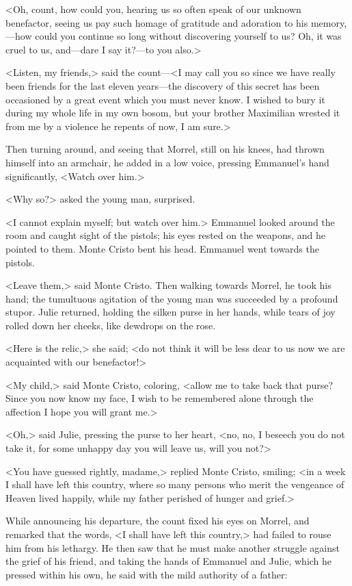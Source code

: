  <Oh, count, how could you, hearing us so often speak of our unknown benefactor, seeing us pay such homage of gratitude and adoration to his memory,—how could you continue so long without discovering yourself to us? Oh, it was cruel to us, and—dare I say it?—to you also.> 

 <Listen, my friends,> said the count—<I may call you so since we have really been friends for the last eleven years—the discovery of this secret has been occasioned by a great event which you must never know. I wished to bury it during my whole life in my own bosom, but your brother Maximilian wrested it from me by a violence he repents of now, I am sure.> 

 Then turning around, and seeing that Morrel, still on his knees, had thrown himself into an armchair, he added in a low voice, pressing Emmanuel's hand significantly, <Watch over him.> 

 <Why so?> asked the young man, surprised. 

 <I cannot explain myself; but watch over him.> Emmanuel looked around the room and caught sight of the pistols; his eyes rested on the weapons, and he pointed to them. Monte Cristo bent his head. Emmanuel went towards the pistols. 

 <Leave them,> said Monte Cristo. Then walking towards Morrel, he took his hand; the tumultuous agitation of the young man was succeeded by a profound stupor. Julie returned, holding the silken purse in her hands, while tears of joy rolled down her cheeks, like dewdrops on the rose. 

 <Here is the relic,> she said; <do not think it will be less dear to us now we are acquainted with our benefactor!> 

 <My child,> said Monte Cristo, coloring, <allow me to take back that purse? Since you now know my face, I wish to be remembered alone through the affection I hope you will grant me.>

 <Oh,> said Julie, pressing the purse to her heart, <no, no, I beseech you do not take it, for some unhappy day you will leave us, will you not?> 

 <You have guessed rightly, madame,> replied Monte Cristo, smiling; <in a week I shall have left this country, where so many persons who merit the vengeance of Heaven lived happily, while my father perished of hunger and grief.> 

 While announcing his departure, the count fixed his eyes on Morrel, and remarked that the words, <I shall have left this country,> had failed to rouse him from his lethargy. He then saw that he must make another struggle against the grief of his friend, and taking the hands of Emmanuel and Julie, which he pressed within his own, he said with the mild authority of a father: 

